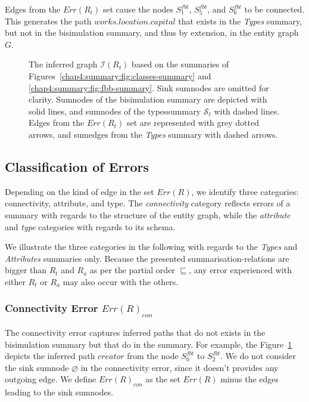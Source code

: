 Edges from the $Err(R_t)$ set cause the nodes $S^{fbt}_1$, $S^{fbt}_5$, and $S^{fbt}_6$ to be connected. This generates the path $works.location.capital$ that exists in the \emph{Types} summary, but not in the bisimulation summary, and thus by extension, in the entity graph $G$.

\begin{figure}
	\centering
	\resizebox{\textwidth}{!}{
		
	}
	\caption[The inferred graph $\mathcal{I}(R_t)$ created from the comparison of the Types and Bisimulation summaries]{The inferred graph $\mathcal{I}(R_t)$ based on the summaries of Figures~\ref{chap4:summary:fig:classes-summary} and \ref{chap4:summary:fig:fbb-summary}.
	Sink sumnodes are omitted for clarity. Sumnodes of the bisimulation summary  are depicted with solid lines, and sumnodes of the \gls{typessummary} $\mathcal{S}_t$ with dashed lines. Edges from the $Err(R_t)$ set are represented with grey dotted arrows, and sumedges from the \emph{Types} summary with dashed arrows.}
	\label{chap5:precision:fig:accuracy}
\end{figure}

\subsection{Classification of Errors}
\label{sec:error-classification}

Depending on the kind of edge in the set $Err(R)$, we identify three categories: \gls{connectivity}, \gls{attribute}, and \gls{type}. The \emph{connectivity} category reflects errors of a summary with regards to the structure of the entity graph, while the \emph{attribute} and \emph{type} categories with regards to its schema.

We illustrate the three categories in the following with regards to the \emph{Types}  and \emph{Attributes}  summaries only. Because the presented \glspl{summarisation-relation} are bigger than $R_t$ and $R_a$ as per the partial order $\sqsubseteq$, any error experienced with either $R_t$ or $R_a$ may also occur with the others.

\subsubsection{Connectivity Error $Err(R)_{con}$}

The connectivity error captures inferred paths that do not exists in the bisimulation summary  but that do in the summary. For example, the Figure~\ref{chap5:precision:fig:accuracy} depicts the inferred path $creator$ from the node $S^{fbt}_0$ to $S^{fbt}_2$.
We do not consider the sink sumnode $\varnothing$ in the connectivity error, since it doesn't provides any outgoing edge. We define $Err(R)_{con}$ as the set $Err(R)$ minus the edges leading to the sink sumnodes.

